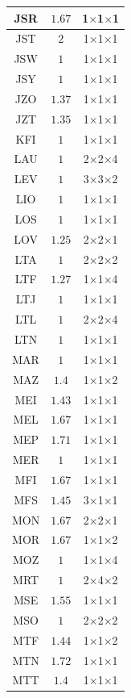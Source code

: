 \documentclass[main.tex]{subfiles}
\begin{document}
\begin{table}
{\begin{minipage}[t]{0.24\linewidth}
\begin{tabular}{|@{\hspace{2pt}}c@{\hspace{2pt}}|@{\hspace{2pt}}c@{\hspace{2pt}}|@{\hspace{2pt}}c@{\hspace{2pt}}|}
JSR&$1.67$&1$\times$1$\times$1\\\hline
JST&$2$&1$\times$1$\times$1\\\hline
JSW&$1$&1$\times$1$\times$1\\\hline
JSY&$1$&1$\times$1$\times$1\\\hline
JZO&$1.37$&1$\times$1$\times$1\\\hline
JZT&$1.35$&1$\times$1$\times$1\\\hline
KFI&$1$&1$\times$1$\times$1\\\hline
LAU&$1$&2$\times$2$\times$4\\\hline
LEV&$1$&3$\times$3$\times$2\\\hline
LIO&$1$&1$\times$1$\times$1\\\hline
LOS&$1$&1$\times$1$\times$1\\\hline
LOV&$1.25$&2$\times$2$\times$1\\\hline
LTA&$1$&2$\times$2$\times$2\\\hline
LTF&$1.27$&1$\times$1$\times$4\\\hline
LTJ&$1$&1$\times$1$\times$1\\\hline
LTL&$1$&2$\times$2$\times$4\\\hline
LTN&$1$&1$\times$1$\times$1\\\hline
MAR&$1$&1$\times$1$\times$1\\\hline
MAZ&$1.4$&1$\times$1$\times$2\\\hline
MEI&$1.43$&1$\times$1$\times$1\\\hline
MEL&$1.67$&1$\times$1$\times$1\\\hline
MEP&$1.71$&1$\times$1$\times$1\\\hline
MER&$1$&1$\times$1$\times$1\\\hline
MFI&$1.67$&1$\times$1$\times$1\\\hline
MFS&$1.45$&3$\times$1$\times$1\\\hline
MON&$1.67$&2$\times$2$\times$1\\\hline
MOR&$1.67$&1$\times$1$\times$2\\\hline
MOZ&$1$&1$\times$1$\times$4\\\hline
MRT&$1$&2$\times$4$\times$2\\\hline
MSE&$1.55$&1$\times$1$\times$1\\\hline
MSO&$1$&2$\times$2$\times$2\\\hline
MTF&$1.44$&1$\times$1$\times$2\\\hline
MTN&$1.72$&1$\times$1$\times$1\\\hline
MTT&$1.4$&1$\times$1$\times$1\\\hline

\end{tabular}
\end{minipage}}
\end{table}
\end{document}
